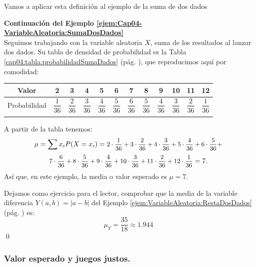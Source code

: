 Vamos a aplicar esta definición al ejemplo de la suma de dos dados
    \begin{Ejemplo}
    \label{ejem:Cap04:VariableAleatoriaSumaDosDadosMedia}
    {\bf Continuación del Ejemplo \ref{ejem:Cap04-VariableAleatoria:SumaDosDados}}\\
    Seguimos trabajando con la variable aleatoria $X$, suma de los resultados al lanzar dos dados.
    Su tabla de densidad de probabilidad es la Tabla \ref{cap04:tabla:probabilidadSumaDados} (pág. \pageref{cap04:tabla:probabilidadSumaDados}), que reproducimos aquí por comodidad:
    \begin{center}
    {\small
    \begin{tabular}[t]{|c|c|c|c|c|c|c|c|c|c|c|c|}
    \hline
    Valor\rule{0cm}{0.5cm}
    &2&3&4&5&6&7&8&9&10&11&12\\
    \hline
    Probabilidad\rule{0cm}{0.7cm}
    &$\dfrac{1}{36}$&$\dfrac{2}{36}$&$\dfrac{3}{36}$&$\dfrac{4}{36}$&$\dfrac{5}{36}$&$\dfrac{6}{36}$&$\dfrac{5}{36}$&$\dfrac{4}{36}$&$\dfrac{3}{36}$&$\dfrac{2}{36}$&$\dfrac{1}{36}$\\
    &&&&&&&&&&&\\
    \hline
    \end{tabular}
    }
    \end{center}
    A partir de la tabla tenemos:
    \[\mu=\sum x_i P(X=x_i)=\mbox{\small $
    2\cdot\dfrac{1}{36}+3\cdot\dfrac{2}{36}+4\cdot\dfrac{3}{36}+5\cdot\dfrac{4}{36}+6\cdot\dfrac{5}{36}+$}\]
    \[\mbox{\small $
    7\cdot\dfrac{6}{36}+8\cdot\dfrac{5}{36}+9\cdot\dfrac{4}{36}+10\cdot\dfrac{3}{36}+11\cdot\dfrac{2}{36}
    +12\cdot\dfrac{1}{36}$}=7.\]
    Así que, en este ejemplo, la media o valor esperado es $\mu=7$.

    Dejamos como ejercicio para el lector, comprobar que la media de la variable diferencia $Y(a,b)=|a-b|$ del Ejemplo \ref{ejem:VariableAleatoria:RestaDosDados} (pág. \pageref{ejem:VariableAleatoria:RestaDosDados}) es:
    \[\mu_Y=\dfrac{35}{18}\approx 1.944\]
    \qed
    \end{Ejemplo}

\subsubsection*{Valor esperado y juegos justos.}


